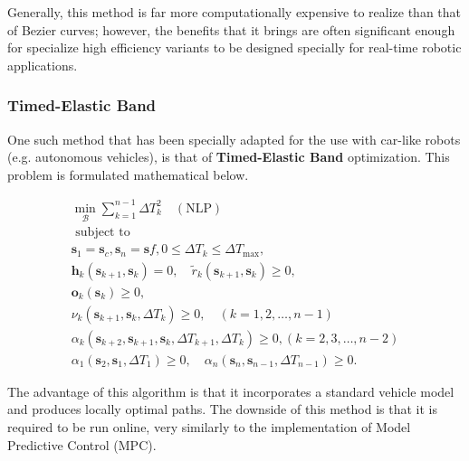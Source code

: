 Generally, this method is far more computationally expensive to realize than that of Bezier curves; however, the benefits that it brings are often significant enough for specialize high efficiency variants to be designed specially for real-time robotic applications. 

\subsubsection{Timed-Elastic Band}
One such method that has been specially adapted for the use with car-like robots (e.g. autonomous vehicles), is that of \textbf{Timed-Elastic Band} optimization. This problem is formulated mathematical below.  

\begin{equation}
    \begin{array}{l}
    \min _{\mathcal{B}} \sum_{k=1}^{n-1} \Delta T_k^2 \quad(\mathrm{NLP}) \\
    \text { subject to } \\
    \mathbf{s}_1=\mathbf{s}_c, \mathbf{s}_n=\mathbf{s} f, 0 \leq \Delta T_k \leq \Delta T_{\max }, \\
    \mathbf{h}_k\left(\mathbf{s}_{k+1}, \mathbf{s}_k\right)=0, \quad \tilde{r}_k\left(\mathbf{s}_{k+1}, \mathbf{s}_k\right) \geq 0, \\
    \mathbf{o}_k\left(\mathbf{s}_k\right) \geq 0, \\
    \nu_k\left(\mathbf{s}_{k+1}, \mathbf{s}_k, \Delta T_k\right) \geq 0, \quad(k=1,2, \ldots, n-1) \\
    \alpha_k\left(\mathbf{s}_{k+2}, \mathbf{s}_{k+1}, \mathbf{s}_k, \Delta T_{k+1}, \Delta T_k\right) \geq 0,(k=2,3, \ldots, n-2) \\
    \alpha_1\left(\mathbf{s}_2, \mathbf{s}_1, \Delta T_1\right) \geq 0, \quad \alpha_n\left(\mathbf{s}_n, \mathbf{s}_{n-1}, \Delta T_{n-1}\right) \geq 0 .
    \end{array}
    \end{equation}

The advantage of this algorithm is that it incorporates a standard vehicle model and produces locally optimal paths. The downside of this method is that it is required to be run online, very similarly to the implementation of Model Predictive Control (MPC).



